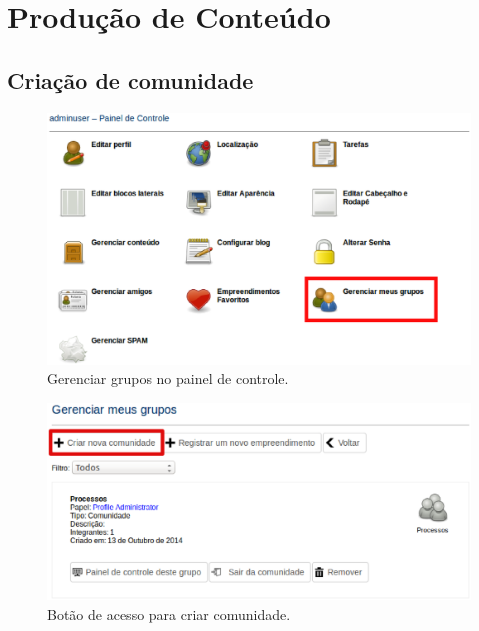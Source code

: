 \chapter{Produção de Conteúdo}
\label{chap:producaoConteudo}

\section{Criação de comunidade}

\begin{figure}[h]
     \centering
       \includegraphics[keepaspectratio=true,scale=0.49]{figuras/painelDeControle.eps}
     \caption{Gerenciar grupos no painel de controle.}
     \label{fig:GerGrupPainelControle}
\end{figure}

\begin{figure}[h]
     \centering
       \includegraphics[keepaspectratio=true,scale=0.49]{figuras/gerenciarGrupos.eps}
     \caption{Botão de acesso para criar comunidade.}
     \label{fig:botaoAcesso}
\end{figure}

